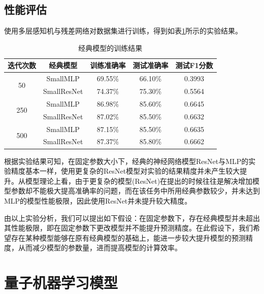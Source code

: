 \documentclass[10pt,a4paper,twoside]{article}
\numberwithin{figure}{section}%
\numberwithin{table}{section}%
\begin{document}
\subsection{性能评估}

使用多层感知机与残差网络对数据集进行训练，得到如表\ref{tab:Classic Model Training Results}所示的实验结果。

\begin{table}[H]
\centering
\caption{经典模型的训练结果}
\label{tab:Classic Model Training Results}
\begin{tabular}{ccccc}
    \toprule
    \textbf{迭代次数} & \textbf{经典模型} & \textbf{训练准确率} & \textbf{测试准确率} & \textbf{测试F1分数} \\
    \midrule
    \multirow{2}{*}{50} & SmallMLP & 69.55\% & 66.10\% & 0.3993 \\
        & SmallResNet & 74.37\% & 75.30\% & 0.5564 \\
    \midrule
    \multirow{2}{*}{250} & SmallMLP & 86.98\% & 85.60\% & 0.6645 \\
        & SmallResNet & 87.02\% & 85.50\% & 0.6632 \\
    \midrule
    \multirow{2}{*}{500} & SmallMLP & 87.15\% & 85.50\% & 0.6635 \\
        & SmallResNet & 87.37\% & 85.80\% & 0.6662 \\
    \bottomrule
\end{tabular}
\end{table}

根据实验结果可知，在固定参数大小下，经典的神经网络模型ResNet与MLP的实验精度基本一样，使用更复杂的ResNet模型对实验的结果精度并未产生较大提升。从模型理论上看，由于更复杂的模型(ResNet)在提出的时候往往是解决增加模型参数却不能极大提高准确率的问题，而在该任务中所用经典参数较少，并未达到MLP的模型性能极限，因此使用ResNet并未提升较大精度。

由以上实验分析，我们可以提出如下假设：在固定参数下，存在经典模型并未超出其性能极限，即在固定参数下更改模型并不能提升预测精度。在此假设下，我们希望存在某种模型能够在原有经典模型的基础上，能进一步较大提升模型的预测精度，从而减少模型的参数量，进而提高模型的计算效率。


\section{量子机器学习模型}
\end{document}
